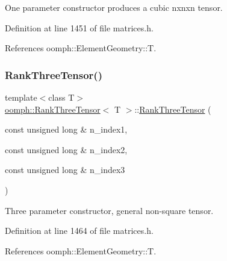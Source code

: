 One parameter constructor produces a cubic nxnxn tensor. 



Definition at line 1451 of file matrices.\+h.



References oomph\+::\+Element\+Geometry\+::T.

\mbox{\label{classoomph_1_1RankThreeTensor_ae876d81ad44aafcd195aeddfdfa913f7}} 
\subsubsection{\texorpdfstring{Rank\+Three\+Tensor()}{RankThreeTensor()}\hspace{0.1cm}{\footnotesize\ttfamily [4/5]}}
{\footnotesize\ttfamily template$<$class T$>$ \\
\hyperlink{classoomph_1_1RankThreeTensor}{oomph\+::\+Rank\+Three\+Tensor}$<$ T $>$\+::\hyperlink{classoomph_1_1RankThreeTensor}{Rank\+Three\+Tensor} (\begin{DoxyParamCaption}\item[{const unsigned long \&}]{n\+\_\+index1,  }\item[{const unsigned long \&}]{n\+\_\+index2,  }\item[{const unsigned long \&}]{n\+\_\+index3 }\end{DoxyParamCaption})\hspace{0.3cm}{\ttfamily [inline]}}



Three parameter constructor, general non-\/square tensor. 



Definition at line 1464 of file matrices.\+h.



References oomph\+::\+Element\+Geometry\+::T.

\mbox{\label{classoomph_1_1RankThreeTensor_a3b3599070a42f679597bcd8a263aed25}} 
